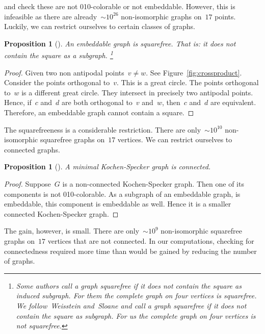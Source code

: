 \documentclass[adraft,copyright,creativecommons]{eptcs}
\newcounter{main}
\newtheorem{prop}[main]{Proposition}
\theoremstyle{definition}
\theoremstyle{remark}
\begin{document}
and check these are not 010-colorable or not embeddable.
However, this is infeasible as there are
already~${\sim}10^{26}$ non-isomorphic
graphs on~$17$ points.\cite{oeisA000088}
Luckily, we can restrict ourselves to certain classes of graphs.
\begin{prop}[\cite{aow11}]
    An embeddable graph is squarefree.
    That is: it does not contain the square as a subgraph.%
    \footnote{Some authors call a graph squarefree if it does not
        contain the square as induced subgraph.
        For them the complete graph on four vertices is squarefree.
        We follow~Weisstein\cite{sf-weisstein} and~Sloane\cite{sf-sloane} and
        call a graph squarefree if it does not
        contain the square as subgraph.
        For us the complete graph on four vertices is not squarefree.}
\end{prop}
\begin{proof}
    Given two non antipodal points~$v\neq w$.
    See Figure~\ref{fig:crossproduct}.
    Consider the points orthogonal to~$v$.
    This is a great circle.
    The points orthogonal to~$w$ is a different great circle.
    They intersect in precisely two antipodal points.
    Hence, if~$c$ and~$d$ are both orthogonal to~$v$ and~$w$,
    then~$c$ and~$d$ are equivalent.
    Therefore, an embeddable graph cannot contain a square.
\end{proof}
The squarefreeness is a considerable restriction.  There are
only~${\sim}10^{10}$ non-isomorphic squarefree graphs on~$17$
vertices.\cite{sf-sloane}
We can restrict ourselves to connected graphs.
\begin{prop}[\cite{aow11}]\label{prop:ks-conn}
    A minimal Kochen-Specker graph is connected.
\end{prop}
\begin{proof}
    Suppose~$G$ is a non-connected Kochen-Specker graph.
    Then one of its components is not 010-colorable.
    As a subgraph of an embeddable graph, is embeddable,
    this component is embeddable as well.
    Hence it is a smaller connected Kochen-Specker graph.
\end{proof}
The gain, however, is small.
There are only~${\sim}10^9$ non-isomorphic squarefree graphs on~$17$
vertices that are not connected.
In our computations, checking for connectedness
required more time than would be gained by reducing the number of graphs.
\end{document}
